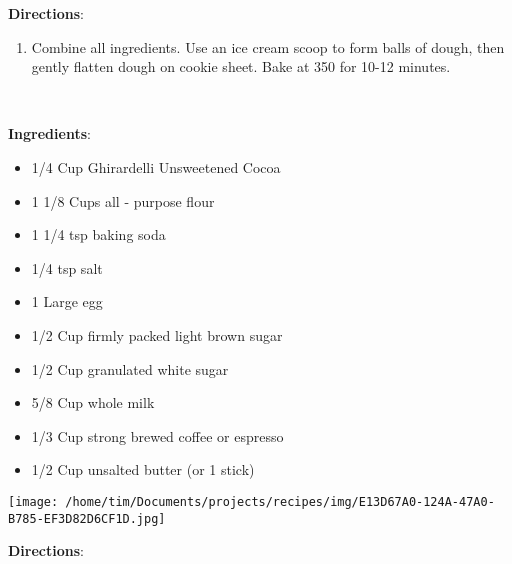 \documentclass[11pt, twoside, openany]{book}
\begin{document}
\textbf{Directions}:
\vspace{-3mm}\begin{enumerate}\setlength\itemsep{-1mm}
\item Combine all ingredients. Use an ice cream scoop to form balls of dough, then gently flatten dough on cookie sheet. Bake at 350 for 10-12 minutes.
\end{enumerate}
 \label{dark-chocolate-cupcakes}\hfill\textit{}\\
\begin{minipage}[t]{0.8\linewidth}
\textbf{Ingredients}:\vspace{-3mm}
\begin{multicols}{2}
\begin{itemize}\setlength\itemsep{-1mm}
\item 1/4 Cup Ghirardelli Unsweetened Cocoa
\item 1 1/8 Cups all - purpose flour
\item 1 1/4 tsp baking soda
\item 1/4 tsp salt
\item 1 Large egg
\item 1/2 Cup firmly packed light brown sugar
\item 1/2 Cup granulated white sugar
\item 5/8 Cup whole milk
\item 1/3 Cup strong brewed coffee or espresso
\item 1/2 Cup unsalted butter (or 1 stick)
\end{itemize}
\end{multicols}
\end{minipage}
\begin{minipage}[t]{0.2\linewidth}
\centering \strut\vspace*{-\baselineskip}\newline
\texttt{[image: /home/tim/Documents/projects/recipes/img/E13D67A0-124A-47A0-B785-EF3D82D6CF1D.jpg]}\\
\end{minipage}\vspace{3mm}
\textbf{Directions}:
\end{document}

